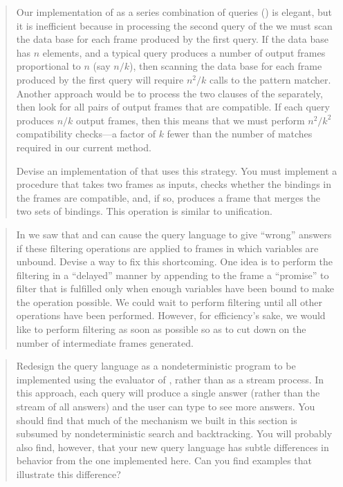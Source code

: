 \begin{quote}
 Our implementation of 
as a series combination of queries () is elegant, but it is
inefficient because in processing the second query of the  we must
scan the data base for each frame produced by the first query.  If the data
base has \( n \) elements, and a typical query produces a number of output frames
proportional to \( n \) (say \( n / k \)), then scanning the data base for each
frame produced by the first query will require \( n^2 / k \) calls to the
pattern matcher.  Another approach would be to process the two clauses of the
 separately, then look for all pairs of output frames that are
compatible.  If each query produces \( n / k \) output frames, then this means
that we must perform \( n^2 / k^2 \) compatibility checks---a factor of \( k \)
fewer than the number of matches required in our current method.

Devise an implementation of  that uses this strategy.  You must
implement a procedure that takes two frames as inputs, checks whether the
bindings in the frames are compatible, and, if so, produces a frame that merges
the two sets of bindings.  This operation is similar to unification.
\end{quote}

\begin{quote}
 In  we saw
that  and  can cause the query language to give
``wrong'' answers if these filtering operations are applied to frames in which
variables are unbound.  Devise a way to fix this shortcoming.  One idea is to
perform the filtering in a ``delayed'' manner by appending to the frame a
``promise'' to filter that is fulfilled only when enough variables have been
bound to make the operation possible.  We could wait to perform filtering until
all other operations have been performed.  However, for efficiency's sake, we
would like to perform filtering as soon as possible so as to cut down on the
number of intermediate frames generated.
\end{quote}

\begin{quote}
 Redesign the query language as a
nondeterministic program to be implemented using the evaluator of
, rather than as a stream process.  In this approach, each query will
produce a single answer (rather than the stream of all answers) and the user
can type  to see more answers.  You should find that much of
the mechanism we built in this section is subsumed by nondeterministic search
and backtracking.  You will probably also find, however, that your new query
language has subtle differences in behavior from the one implemented here.  Can
you find examples that illustrate this difference?
\end{quote}

